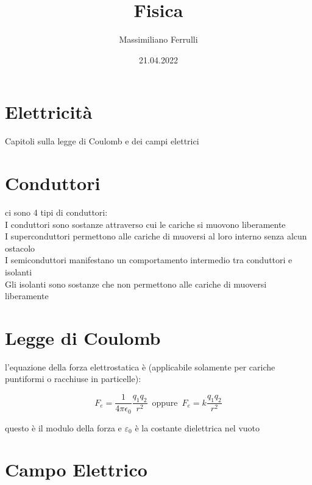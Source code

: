 \documentclass[a4paper,11pt]{article}
\begin{document}
\title{Fisica}

\author{Massimiliano Ferrulli}
\date{21.04.2022}



\maketitle

\section*{Elettricità}
Capitoli sulla legge di Coulomb e dei campi elettrici

\pagebreak
\tableofcontents
\pagebreak

\section{Conduttori}
ci sono 4 tipi di conduttori:
\\
I conduttori sono sostanze attraverso cui le cariche si muovono liberamente
\\
I superconduttori permettono alle cariche di muoversi al loro interno senza alcun ostacolo
\\
I semiconduttori manifestano un comportamento intermedio tra conduttori e isolanti
\\
Gli isolanti sono sostanze che non permettono alle cariche di muoversi liberamente

\section{Legge di Coulomb}
l'equazione della forza elettrostatica è (applicabile solamente per cariche puntiformi o racchiuse in particelle):
\begin{center}
    \[
    F_e = \frac{1}{4\pi \epsilon_0}\frac{q_1 q_2}{r^2} \, \, \,  \text{oppure} \, \, \, F_e = k  \frac{q_1 q_2}{r^2}
    \]
\end{center}
questo è il modulo della forza e \( \varepsilon_0\) è la costante dielettrica nel vuoto

\section{Campo Elettrico}
\end{document}
